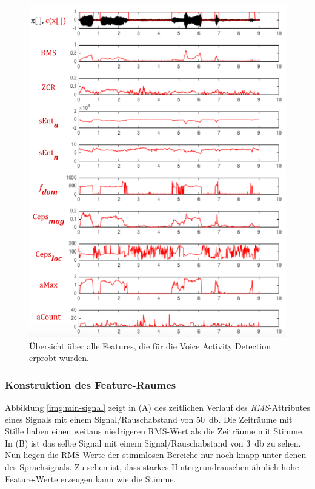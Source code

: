 \begin{figure}[h!]
	\centering
	\includegraphics[width=1\textwidth]{bilder/allFeatures01.png}
	\caption{Übersicht über alle Features, die für die Voice Activity Detection erprobt wurden.}
	\label{img:vadAllFeatures}
\end{figure}

\subsubsection{Konstruktion des Feature-Raumes}
\label{sec:theFeatureSpace}

Abbildung \ref{img:min-signal} zeigt in (A) des zeitlichen Verlauf des \emph{RMS}-Attributes eines Signals mit einem Signal/Rauschabstand von \SI{50}{\decibel}. Die Zeiträume mit Stille haben einen weitaus niedrigeren RMS-Wert als die Zeiträume mit Stimme. In (B) ist das selbe Signal mit einem Signal/Rauschabstand von \SI{3}{\decibel} zu sehen. Nun liegen die RMS-Werte der stimmlosen Bereiche nur noch knapp unter denen des Sprachsignals. Zu sehen ist, dass starkes Hintergrundrauschen ähnlich hohe Feature-Werte erzeugen kann wie die Stimme.

